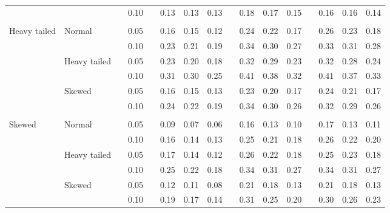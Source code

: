 \documentclass[12pt]{article} %
\begin{document}
\begin{table}[ht]
\begin{scriptsize}
\begin{center}
\begin{tabular}{ll p{.1cm} c p{.1cm} rrr p{.1cm} rrr p{.1cm} rrr}
\rowcolor{gray!20}             &              && 0.10 &&   0.13 & 0.13 & 0.13 && 0.18 & 0.17 & 0.15 && 0.16 & 0.16 & 0.14 \\ 
             &&&&&&&&&&&&&&&\\
Heavy tailed & Normal       && 0.05 &&   0.16 & 0.15 & 0.12 && 0.24 & 0.22 & 0.17 &&  0.26 & 0.23 & 0.18 \\
             &              && 0.10 &&   0.23 & 0.21 & 0.19 && 0.34 & 0.30 & 0.27 &&  0.33 & 0.31 & 0.28 \\
             & Heavy tailed && 0.05 &&   0.23 & 0.20 & 0.18 && 0.32 & 0.29 & 0.23 &&  0.32 & 0.28 & 0.24 \\
             &              && 0.10 &&   0.31 & 0.30 & 0.25 && 0.41 & 0.38 & 0.32 &&  0.41 & 0.37 & 0.33 \\
             & Skewed       && 0.05 &&   0.16 & 0.15 & 0.13 && 0.23 & 0.20 & 0.17 &&  0.24 & 0.21 & 0.17 \\
             &              && 0.10 &&   0.24 & 0.22 & 0.19 && 0.34 & 0.30 & 0.26 &&  0.32 & 0.29 & 0.26 \\
             &&&&&&&&&&&&&&&\\ 
Skewed       & Normal       && 0.05 &&   0.09 & 0.07 & 0.06 && 0.16 & 0.13 & 0.10 && 0.17 & 0.13 & 0.11 \\ 
             &              && 0.10 &&   0.16 & 0.14 & 0.13 && 0.25 & 0.21 & 0.18 && 0.26 & 0.22 & 0.20 \\ 
             & Heavy tailed && 0.05 &&   0.17 & 0.14 & 0.12 && 0.26 & 0.22 & 0.18 && 0.25 & 0.23 & 0.18 \\ 
             &              && 0.10 &&   0.25 & 0.22 & 0.18 && 0.34 & 0.31 & 0.27 && 0.34 & 0.31 & 0.27 \\ 
             & Skewed       && 0.05 &&   0.12 & 0.11 & 0.08 && 0.21 & 0.18 & 0.13 && 0.21 & 0.18 & 0.13 \\ 
             &              && 0.10 &&   0.19 & 0.17 & 0.14 && 0.31 & 0.25 & 0.20 && 0.30 & 0.26 & 0.23 \\ 



\end{tabular}
\end{center}
\end{scriptsize}
\end{table}
\end{document}
